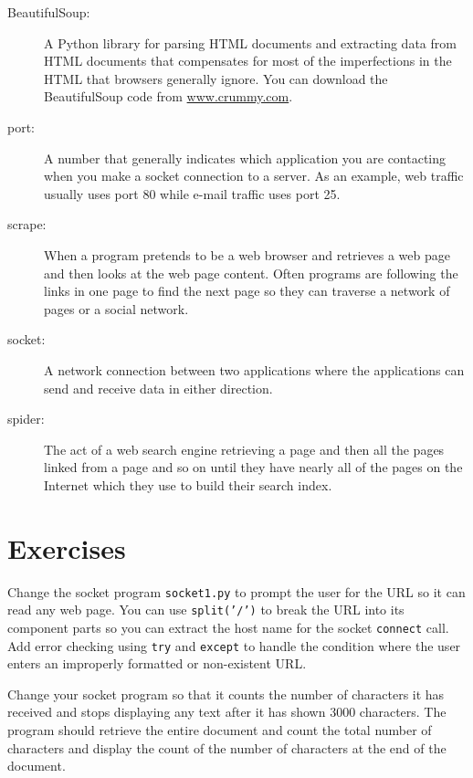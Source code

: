 \documentclass[11pt]{book}
\begin{document}
\begin{description}

\item[BeautifulSoup:] A Python library for parsing HTML documents
and extracting data from HTML documents
that compensates for most of the imperfections in the HTML that browsers
generally ignore.
You can download the BeautifulSoup code
from 
\url{www.crummy.com}.

\item[port:] A number that generally indicates which application 
you are contacting when you make a socket connection to a server.
As an example, web traffic usually uses port 80 while e-mail 
traffic uses port 25.

\item[scrape:] When a program pretends to be a web browser and
retrieves a web page and then looks at the web page content. 
Often programs are following the links in one page to find the next
page so they can traverse a network of pages or a social network.

\item[socket:] A network connection between two applications
where the applications can send and receive data in either direction.

\item[spider:] The act of a web search engine retrieving a page and
then all the pages linked from a page and so on until they have 
nearly all of the pages on the Internet which they 
use to build their search index.

\end{description}

\section{Exercises}

\begin{ex}
Change the socket program {\tt socket1.py} to prompt the user for 
the URL so it can read any web page.  
You can use {\tt split('/')} to break the URL into its component parts
so you can extract the host name for the socket {\tt connect} call.
Add error checking using {\tt try} and {\tt except} to handle the condition where the 
user enters an improperly formatted or non-existent URL.  
\end{ex}

\begin{ex}
Change your socket program so that it counts the number of characters it has received 
and stops displaying any text after it has shown 3000 characters.  The program 
should retrieve the entire document and count the total number of characters 
and display the count of the number of characters at the end of the document.
\end{ex}
\end{document}
